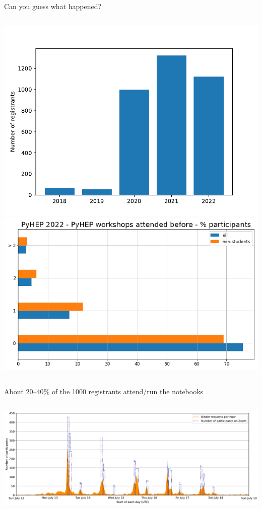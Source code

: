 \documentclass[aspectratio=169]{beamer}
\begin{document}
\begin{frame}{Can you guess what happened?}
\vspace{0.5 cm}

\begin{columns}
\includegraphics[height=5 cm]{PLOTS/pyhep-registration.pdf}\includegraphics[height=5 cm]{PLOTS/pyhep-2022-attended-before.pdf}
\end{columns}

\vspace{1 cm}
\end{frame}

\begin{frame}{About 20--40\% of the 1000 registrants attend/run the notebooks}
\vspace{0.5 cm}

\begin{columns}
\includegraphics[width=\linewidth]{PLOTS/binder-launches-zoom-attendance.pdf}
\end{columns}
\end{frame}
\end{document}
